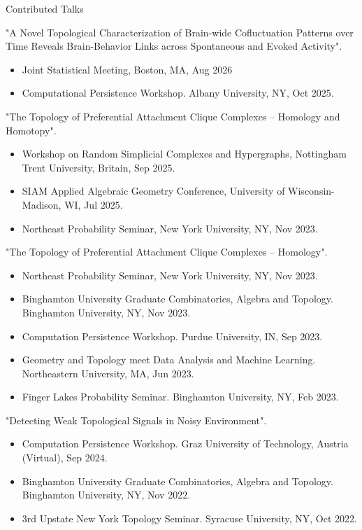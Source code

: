 \documentclass{resume} %
\begin{document}
\newpage
\begin{rSection}{Contributed Talks}

"A Novel Topological Characterization of Brain-wide Cofluctuation Patterns over Time Reveals Brain-Behavior Links across Spontaneous and Evoked Activity".
\begin{itemize}[noitemsep]
	\item Joint Statistical Meeting, Boston, MA, Aug 2026
    \item Computational Persistence Workshop. Albany University, NY, Oct 2025.
\end{itemize}

"The Topology of Preferential Attachment Clique Complexes -- Homology and Homotopy".
\begin{itemize}[noitemsep]
    \item Workshop on Random Simplicial Complexes and Hypergraphs, Nottingham Trent University, Britain, Sep 2025.
    \item SIAM Applied Algebraic Geometry Conference, University of Wisconsin-Madison, WI, Jul 2025.
    \item Northeast Probability Seminar, New York University, NY, Nov 2023.
\end{itemize}
"The Topology of Preferential Attachment Clique Complexes -- Homology".
\begin{itemize}[noitemsep]
    \item Northeast Probability Seminar, New York University, NY, Nov 2023.
    \item Binghamton University Graduate Combinatorics, Algebra and Topology. Binghamton University, NY, Nov 2023.
    \item Computation Persistence Workshop. Purdue University, IN, Sep 2023.
    \item Geometry and Topology meet Data Analysis and Machine Learning. Northeastern University, MA, Jun 2023.
    \item Finger Lakes Probability Seminar. Binghamton University, NY, Feb 2023.
\end{itemize}
"Detecting Weak Topological Signals in Noisy Environment".
\begin{itemize}[noitemsep]
    \item Computation Persistence Workshop. Graz University of Technology, Austria (Virtual), Sep 2024.
    \item Binghamton University Graduate Combinatorics, Algebra and Topology. Binghamton University, NY, Nov 2022.
    \item 3rd Upstate New York Topology Seminar. Syracuse University, NY, Oct 2022.
\end{itemize}
\end{rSection}
\end{document}
